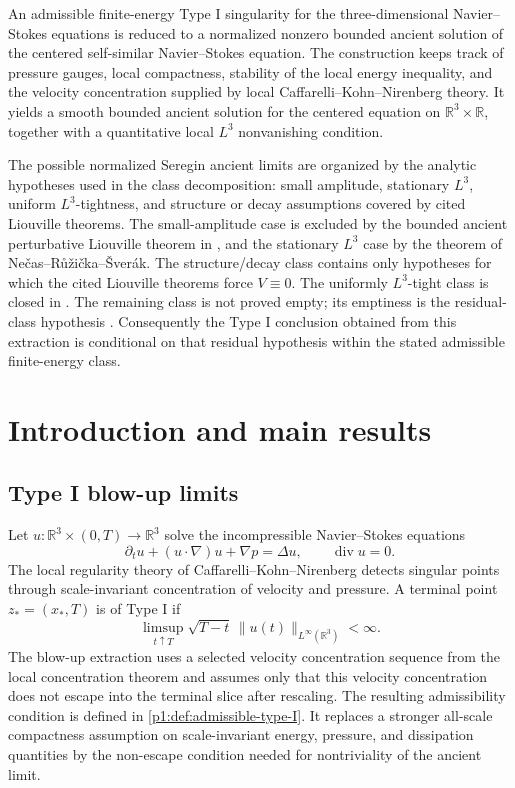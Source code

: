 \documentclass[11pt]{amsart}
\theoremstyle{plain}
\theoremstyle{definition}
\theoremstyle{remark}
\numberwithin{equation}{section}
\newcommand{\R}{\mathbb R}
\newcommand{\divergence}{\operatorname{div}}
\begin{document}
An admissible finite-energy Type I singularity for the
three-dimensional Navier--Stokes equations is reduced to a normalized nonzero
bounded ancient solution of the centered self-similar Navier--Stokes equation.  The
construction keeps track of pressure gauges, local compactness, stability of
the local energy inequality, and the velocity concentration supplied by local
Caffarelli--Kohn--Nirenberg theory.  It yields a smooth bounded ancient solution
for the centered equation on \(\R^3\times\R\), together with a quantitative
local \(L^3\) nonvanishing condition.

The possible normalized Seregin ancient limits are organized by the analytic
hypotheses used in the class decomposition: small amplitude, stationary
\(L^3\), uniform \(L^3\)-tightness, and structure or decay assumptions covered
by cited Liouville theorems.  The small-amplitude case is excluded by the bounded ancient
perturbative Liouville theorem in , and the stationary \(L^3\) case by
the theorem of Ne\v{c}as--R\r{u}\v{z}i\v{c}ka--\v{S}ver\'ak.  The
structure/decay class contains only hypotheses for which the cited Liouville
theorems force \(V\equiv0\).  The uniformly \(L^3\)-tight class is closed in
.  The remaining class is not proved empty; its
emptiness is the residual-class hypothesis .
Consequently the Type I conclusion obtained from this extraction is conditional
on that residual hypothesis within the stated admissible finite-energy class.

\section{Introduction and main results}\label{p1:sec:introduction}

\subsection{Type I blow-up limits}

Let \(u:\R^3\times(0,T)\to\R^3\) solve the incompressible Navier--Stokes
equations
\begin{equation}\label{p1:eq:NS}
   \partial_tu+(u\cdot\nabla)u+\nabla p=\Delta u,\qquad
   \divergence u=0.
\end{equation}
The local regularity theory of Caffarelli--Kohn--Nirenberg \cite{CKN1982}
detects singular points through scale-invariant concentration of velocity and
pressure.  A terminal point \(z_*=(x_*,T)\) is of Type I if
\begin{equation}\label{p1:eq:type-I-bound}
   \limsup_{t\uparrow T}\sqrt{T-t}\,
   \|u(t)\|_{L^\infty(\R^3)}<\infty .
\end{equation}
The blow-up extraction uses a selected velocity concentration sequence from
the local concentration theorem and assumes only that this velocity
concentration does not escape into the terminal slice after rescaling.  The
resulting admissibility condition is defined in
\cref{p1:def:admissible-type-I}.  It replaces a stronger all-scale compactness
assumption on scale-invariant energy, pressure, and dissipation quantities by
the non-escape condition needed for nontriviality of the ancient limit.
\end{document}
